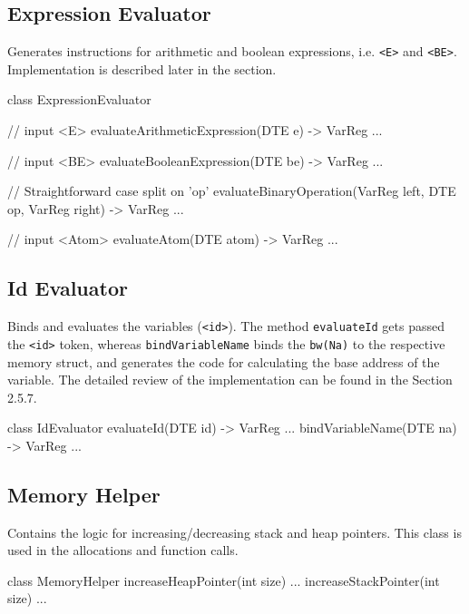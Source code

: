 \subsection{Expression Evaluator}
Generates instructions for arithmetic and boolean expressions, i.e. \verb+<E>+ and \verb+<BE>+.
Implementation is described later in the section.
\begin{codeblock}
class ExpressionEvaluator {
    // input <E>
    evaluateArithmeticExpression(DTE e) -> VarReg { ... }

    // input <BE>
    evaluateBooleanExpression(DTE be) -> VarReg { ... }

    // Straightforward case split on 'op'
    evaluateBinaryOperation(VarReg left, DTE op, VarReg right) -> VarReg { ... }

    // input <Atom>
    evaluateAtom(DTE atom) -> VarReg { ... }
}
\end{codeblock}

\subsection{Id Evaluator}
Binds and evaluates the variables (\verb+<id>+). The method \verb+evaluateId+ gets passed the \verb+<id>+ token,
whereas \verb+bindVariableName+ binds the \verb+bw(Na)+ to the respective memory struct, and generates the code for
calculating the base address of the variable. The detailed review of the implementation can be found in the Section 2.5.7.
\begin{codeblock}
class IdEvaluator {
    evaluateId(DTE id) -> VarReg { ... }
    bindVariableName(DTE na) -> VarReg { ... }
}
\end{codeblock}
\subsection{Memory Helper}
Contains the logic for increasing/decreasing stack and heap pointers. This class is used in the allocations and function calls.
\begin{codeblock}
class MemoryHelper {
    increaseHeapPointer(int size) { ... }
    increaseStackPointer(int size) { ... }
}
\end{codeblock}
